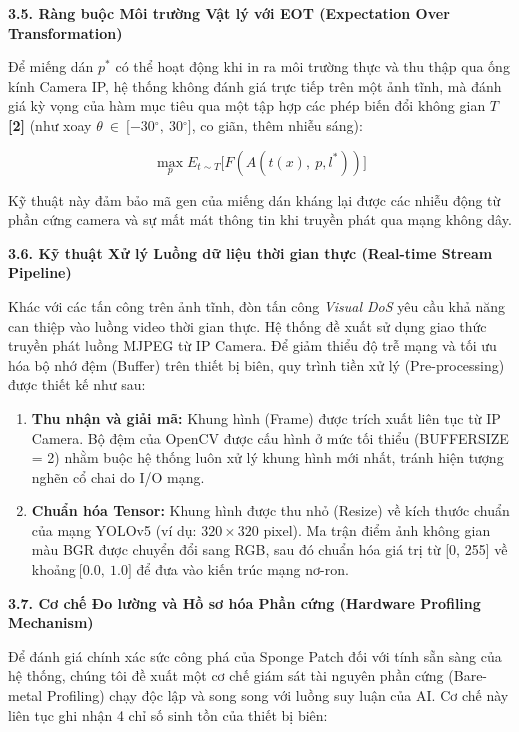 \textbf{3.5. Ràng buộc Môi trường Vật lý với EOT (Expectation Over
Transformation)}

Để miếng dán \(p^{*}\) có thể hoạt động khi in ra môi trường thực và thu
thập qua ống kính Camera IP, hệ thống không đánh giá trực tiếp trên một
ảnh tĩnh, mà đánh giá kỳ vọng của hàm mục tiêu qua một tập hợp các phép
biến đổi không gian \(T\) \textbf{{[}2{]}} (như xoay
\(\theta\  \in \ \lbrack - 30{^\circ},\ 30{^\circ}\rbrack\), co giãn,
thêm nhiễu sáng):

\[\max_{p}E_{t\sim T}\lbrack F(A(t(x),\ p,l^{*}))\rbrack\]

Kỹ thuật này đảm bảo mã gen của miếng dán kháng lại được các nhiễu động
từ phần cứng camera và sự mất mát thông tin khi truyền phát qua mạng
không dây.\textbf{\hfill\break
}

\textbf{3.6. Kỹ thuật Xử lý Luồng dữ liệu thời gian thực (Real-time
Stream Pipeline)}

Khác với các tấn công trên ảnh tĩnh, đòn tấn công \emph{Visual DoS} yêu
cầu khả năng can thiệp vào luồng video thời gian thực. Hệ thống đề xuất
sử dụng giao thức truyền phát luồng MJPEG từ IP Camera. Để giảm thiểu độ
trễ mạng và tối ưu hóa bộ nhớ đệm (Buffer) trên thiết bị biên, quy trình
tiền xử lý (Pre-processing) được thiết kế như sau:

\begin{enumerate}
\def\labelenumi{\arabic{enumi}.}
\item
  \textbf{Thu nhận và giải mã:} Khung hình (Frame) được trích xuất liên
  tục từ IP Camera. Bộ đệm của OpenCV được cấu hình ở mức tối thiểu
  (BUFFERSIZE = 2) nhằm buộc hệ thống luôn xử lý khung hình mới nhất,
  tránh hiện tượng nghẽn cổ chai do I/O mạng.
\item
  \textbf{Chuẩn hóa Tensor:} Khung hình được thu nhỏ (Resize) về kích
  thước chuẩn của mạng YOLOv5 (ví dụ: \(320 \times 320\) pixel). Ma trận
  điểm ảnh không gian màu BGR được chuyển đổi sang RGB, sau đó chuẩn hóa
  giá trị từ {[}0, 255{]} về khoảng\(\ \lbrack 0.0,\ 1.0\rbrack\) để đưa
  vào kiến trúc mạng nơ-ron.
\end{enumerate}

\textbf{3.7. Cơ chế Đo lường và Hồ sơ hóa Phần cứng (Hardware Profiling
Mechanism)}

Để đánh giá chính xác sức công phá của Sponge Patch đối với tính sẵn
sàng của hệ thống, chúng tôi đề xuất một cơ chế giám sát tài nguyên phần
cứng (Bare-metal Profiling) chạy độc lập và song song với luồng suy luận
của AI. Cơ chế này liên tục ghi nhận 4 chỉ số sinh tồn của thiết bị
biên:

